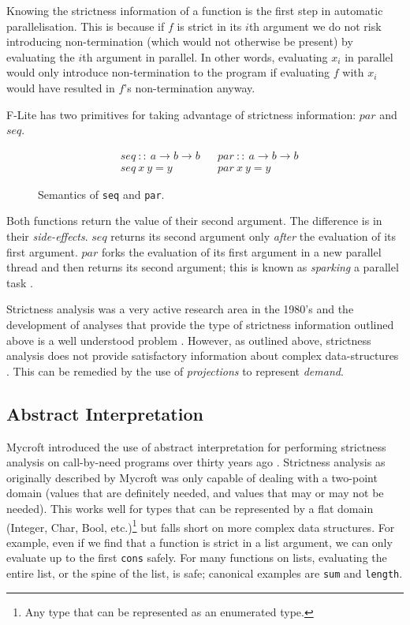 Knowing the strictness information of a function is the first step in automatic
parallelisation. This is because if $f$ is strict in its $i$th argument we do
not risk introducing non-termination (which would not otherwise be present) by
evaluating the $i$th argument in parallel. In other words, evaluating $x_{i}$ in
parallel would only introduce non-termination to the program if evaluating $f$
with $x_{i}$ would have resulted in $f$'s non-termination anyway.

F-Lite has two primitives for taking advantage of strictness information: $par$
and $seq$.
\begin{figure}
\begin{align*}
    &seq \ :: \ a \rightarrow b \rightarrow b &&par \ :: \ a \rightarrow b \rightarrow b \\
    &seq \ x \ y = y                          &&par \ x \ y = y
\end{align*}
\caption{Semantics of \texttt{seq} and \texttt{par}.}
\label{fig:seqandpar}
\end{figure}

Both functions return the value of their second argument. The difference is in
their \emph{side-effects}. $seq$ returns its second argument only \emph{after}
the evaluation of its first argument. $par$ forks the evaluation of its first
argument in a new parallel thread and then returns its second argument; this is
known as \emph{sparking} a parallel task \citep{clack1986four}.

Strictness analysis was a very active research area in the 1980's and the
development of analyses that provide the type of strictness information
outlined above is a well understood problem \citep{mycroft1980theory,
clack1985strictness, burn1986strictness}.  However, as outlined above,
strictness analysis does not provide satisfactory information about complex
data-structures \citep{wadler1987strictness}. This can be remedied by the
use of \emph{projections} to represent \emph{demand}.

\subsection{Abstract Interpretation}

Mycroft introduced the use of abstract interpretation for performing strictness
analysis on call-by-need programs over thirty years ago
\citep{mycroft1980theory}.
Strictness analysis as originally described by Mycroft was only capable of
dealing with a two-point domain (values that are definitely needed, and values
that may or may not be needed). This works well for types that can be
represented by a flat domain (Integer, Char, Bool, etc.)\footnote{Any type that
can be represented as an enumerated type.} but falls short on more complex data
structures. For example, even if we find that a function is strict in a list
argument, we can only evaluate up to the first \verb'cons' safely. For many
functions on lists, evaluating the entire list, or the spine of the list, is
safe; canonical examples are \verb'sum' and \verb'length'.


